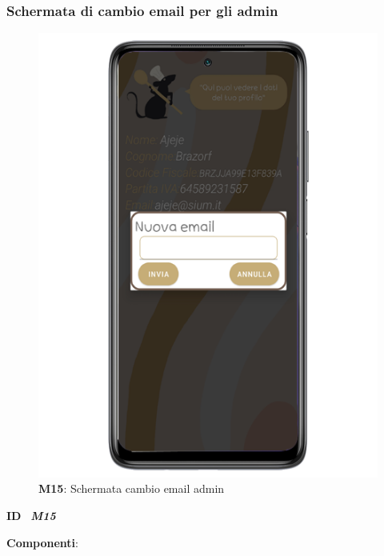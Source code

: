                \subsubsection{Schermata di cambio email per gli admin}
                  \begin{figure}[H]
                    \centering
                    \includegraphics[scale=2.5]{assets/Mockup/Mockup_AdminChangeMail.png}
                    \caption*{\textbf{M15}: Schermata cambio email admin}\label{fig:Mockup_AdminChangeMail}
                  \end{figure}
        
                  \begin{flushleft}
                    \textbf{ID}   \ \Large{\textit{\textbf{M15}}}
                  \end{flushleft}
        
                  \textbf{Componenti}:
                  
